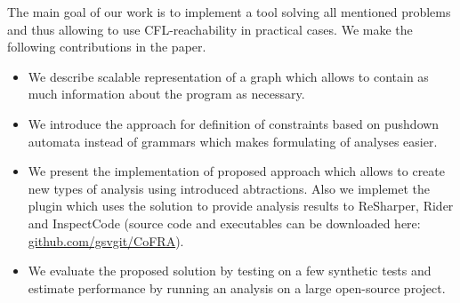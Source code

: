 The main goal of our work is to implement a tool solving all mentioned problems and thus allowing to use CFL-reachability in practical cases.
We make the following contributions in the paper.
\begin{itemize}
	\item We describe scalable representation of a graph which allows to contain as much information about the program as necessary.
	\item We introduce the approach for definition of constraints based on pushdown automata instead of grammars which makes formulating of analyses easier.
	\item We present the implementation of proposed approach which allows to create new types of analysis using introduced abtractions.
	Also we implemet the plugin which uses the solution to provide analysis results to ReSharper, Rider and InspectCode (source code and executables can be downloaded here: \url{github.com/gsvgit/CoFRA}).
	\item We evaluate the proposed solution by testing on a few synthetic tests and estimate performance by running an analysis on a large open-source project.
\end{itemize}

